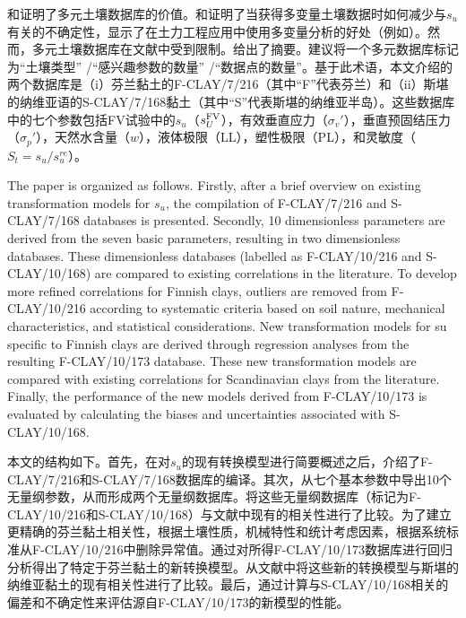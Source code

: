 \begin{ParaColumn}
    \switchcolumn

    \citet{Ching201252,Ching2012522, Ching2013907,Ching2014663,Ching2014686}和\citet{Ching201477}证明了多元土壤数据库的价值。\citet{Müller2014231,Müller2016603}和\citet{Prästings20161}证明了当获得多变量土壤数据时如何减少与$s_u$有关的不确定性，显示了在土力工程应用中使用多变量分析的好处（例如\citealt{Ching201016}）。然而，多元土壤数据库在文献中受到限制。给出了摘要。\citet{Ching2014663}建议将一个多元数据库标记为“土壤类型” /“感兴趣参数的数量” /“数据点的数量”。基于此术语，本文介绍的两个数据库是（i）芬兰黏土的F-CLAY/7/216（其中“F”代表芬兰）和（ii）斯堪的纳维亚语的S-CLAY/7/168黏土（其中“S”代表斯堪的纳维亚半岛）。这些数据库中的七个参数包括FV试验中的$s_u$（$s_U^{\rm{FV}}$），有效垂直应力（$\sigma_v'$），垂直预固结压力（$\sigma_p'$），天然水含量（$w$），液体极限（LL），塑性极限（PL），和灵敏度（$S_t=s_u/s_u^{re}$）。

    
    \switchcolumn*

    The paper is organized as follows. Firstly, after a brief overview on existing transformation models for $s_u$, the compilation of F-CLAY/7/216 and S-CLAY/7/168 databases is presented. Secondly, 10 dimensionless parameters are derived from the seven basic parameters, resulting in two dimensionless databases. These dimensionless databases (labelled as F-CLAY/10/216 and S-CLAY/10/168) are compared to existing correlations in the literature. To develop more reﬁned correlations for Finnish clays, outliers are removed from F-CLAY/10/216 according to systematic criteria based on soil nature, mechanical characteristics, and statistical considerations. New transformation models for su speciﬁc to Finnish clays are derived through regression analyses from the resulting F-CLAY/10/173 database. These new transformation models are compared with existing correlations for Scandinavian clays from the literature. Finally, the performance of the new models derived from F-CLAY/10/173 is evaluated by calculating the biases and uncertainties associated with S-CLAY/10/168.

    \switchcolumn

    本文的结构如下。首先，在对$s_u$的现有转换模型进行简要概述之后，介绍了F-CLAY/7/216和S-CLAY/7/168数据库的编译。其次，从七个基本参数中导出10个无量纲参数，从而形成两个无量纲数据库。将这些无量纲数据库（标记为F-CLAY/10/216和S-CLAY/10/168）与文献中现有的相关性进行了比较。为了建立更精确的芬兰黏土相关性，根据土壤性质，机械特性和统计考虑因素，根据系统标准从F-CLAY/10/216中删除异常值。通过对所得F-CLAY/10/173数据库进行回归分析得出了特定于芬兰黏土的新转换模型。从文献中将这些新的转换模型与斯堪的纳维亚黏土的现有相关性进行了比较。最后，通过计算与S-CLAY/10/168相关的偏差和不确定性来评估源自F-CLAY/10/173的新模型的性能。

\end{ParaColumn}